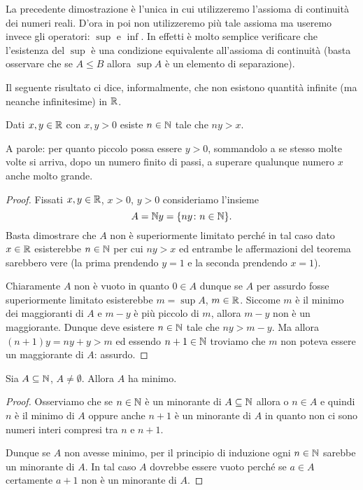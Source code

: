 La precedente dimostrazione è l'unica in cui 
utilizzeremo l'assioma di continuità dei numeri reali.
D'ora in poi non utilizzeremo più tale assioma ma useremo invece
gli operatori: $\sup$ e $\inf$.
In effetti è molto semplice verificare che l'esistenza del $\sup$
è una condizione equivalente all'assioma di continuità
(basta osservare che se $A\le B$ allora $\sup A$ è
un elemento di separazione).

Il seguente risultato ci dice, informalmente, che non 
esistono quantità infinite (ma neanche infinitesime) in ${\mathbb R}$.
%
\begin{theorem}
\mymark{**}%
%
  Dati $x,y\in {\mathbb R}$ con $x,y>0$ esiste $n\in {\mathbb N}$ 
  tale che $n y > x$.

  A parole: per quanto piccolo possa essere $y>0$, 
  sommandolo a se stesso molte volte si arriva, 
  dopo un numero finito di passi, a superare 
  qualunque numero $x$ anche molto grande.
\end{theorem}
%
\begin{proof}
\mymark{*}
  Fissati $x,y\in {\mathbb R}$, $x>0$, $y>0$ consideriamo l'insieme 
  \[
     A = {\mathbb N} y = {\left\{ ny\colon n\in {\mathbb N} \right\}}.
  \]
  Basta dimostrare che $A$ non è superiormente limitato perché 
  in tal caso dato $x\in {\mathbb R}$ esisterebbe $n\in {\mathbb N}$ per cui $ny> x$
  ed entrambe le affermazioni del teorema sarebbero vere (la prima 
  prendendo $y=1$ e la seconda prendendo $x=1$).

  Chiaramente $A$ non è vuoto in quanto $0\in A$ dunque se $A$ 
  per assurdo fosse superiormente limitato esisterebbe 
  $m=\sup A$, $m\in {\mathbb R}$. 
  Siccome $m$ è il minimo dei maggioranti di $A$
  e $m-y$ è più piccolo di $m$, allora $m-y$ non è un maggiorante. 
  Dunque deve esistere $n\in {\mathbb N}$ tale che $ny>m-y$.
  Ma allora $(n+1)y = ny + y > m$ ed essendo $n+1\in {\mathbb N}$ troviamo che $m$
  non poteva essere un maggiorante di $A$: assurdo.
\end{proof}

\begin{theorem}
  Sia $A\subseteq {\mathbb N}$, $A\neq \emptyset$. 
  Allora $A$ ha minimo.
\end{theorem}
%
\begin{proof}
  Osserviamo che se $n\in {\mathbb N}$ è un minorante di $A\subseteq {\mathbb N}$ 
  allora o $n\in A$ e quindi $n$ è il minimo di $A$
  oppure anche $n+1$ è un minorante di $A$ in quanto 
  non ci sono numeri interi compresi tra $n$ e $n+1$.

  Dunque se $A$ non avesse minimo, per il principio di induzione 
  ogni $n\in{\mathbb N}$ sarebbe un minorante di $A$.
  In tal caso $A$ dovrebbe essere vuoto perché se $a\in A$ 
  certamente $a+1$ non è un minorante di $A$.
\end{proof}


